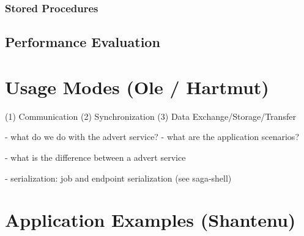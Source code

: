 \documentclass[a4paper,10pt,twocolumn]{article}
\begin{document}
\subsubsection{Stored Procedures}

\subsection{Performance Evaluation}

\section{Usage Modes (Ole / Hartmut)}

(1) Communication (2) Synchronization (3) Data Exchange/Storage/Transfer

- what do we do with the advert service? 
- what are the application scenarios? 

- what is the difference between a advert service 

- serialization: job and endpoint serialization (see saga-shell)

\section{Application Examples (Shantenu)}

\thispagestyle{plain}
\end{document}
